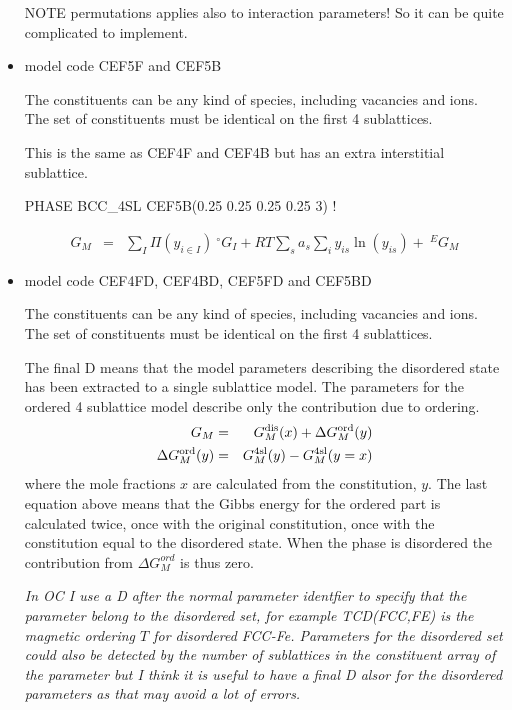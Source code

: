\documentclass[12pt]{article}
\begin{document}
\begin{itemize}
  NOTE permutations applies also to interaction parameters!  So it can
  be quite complicated to implement.


\item model code CEF5F and CEF5B 

  The constituents can be any kind of species, including vacancies and
  ions.  The set of constituents must be identical on the first 4
  sublattices.

  This is the same as CEF4F and CEF4B but has an extra interstitial
  sublattice.

  PHASE BCC\_4SL CEF5B(0.25 0.25 0.25 0.25 3) ! 

  \begin{eqnarray}
    G_M &=& \sum_I \Pi(y_{i\in I}) ~^{\circ}G_I + RT \sum_s a_s\sum_i y_{is}\ln(y_{is}) + ~^EG_M
  \end{eqnarray}

\item model code CEF4FD, CEF4BD, CEF5FD and CEF5BD

  The constituents can be any kind of species, including vacancies and
  ions.  The set of constituents must be identical on the first 4
  sublattices.

  The final D means that the model parameters describing the
  disordered state has been extracted to a single sublattice model.
  The parameters for the ordered 4 sublattice model describe only the
  contribution due to ordering.
  \begin{eqnarray}
    G_M &=& G_M^{\rm dis}(x) + \Delta G_M^{\rm ord}(y)\\
    \Delta G_M^{\rm ord}(y) &=& G_M^{\rm 4sl}(y) - G_M^{\rm 4sl}(y=x)
  \end{eqnarray}
  where the mole fractions $x$ are calculated from the constitution,
  $y$.  The last equation above means that the Gibbs energy for the
  ordered part is calculated twice, once with the original
  constitution, once with the constitution equal to the disordered
  state.  When the phase is disordered the contribution from $\Delta
  G_M^{ord}$ is thus zero.

  {\em In OC I use a D after the normal parameter identfier to specify
    that the parameter belong to the disordered set, for example
    TCD(FCC,FE) is the magnetic ordering $T$ for disordered FCC-Fe.
    Parameters for the disordered set could also be detected by the
    number of sublattices in the constituent array of the parameter
    but I think it is useful to have a final D alsor for the
    disordered parameters as that may avoid a lot of errors.}


\end{itemize}
\end{document}
